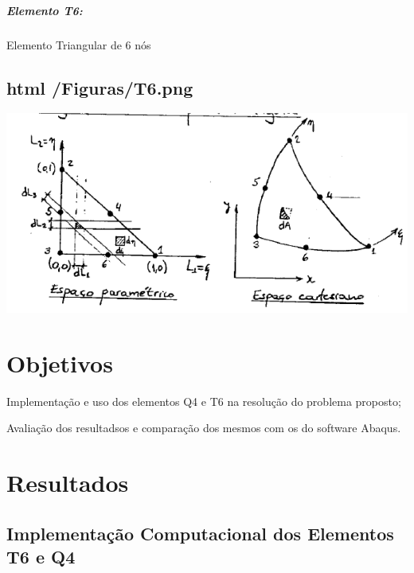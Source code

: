 \subparagraph*{Elemento T6\+:}


\begin{DoxyItemize}
\item Elemento Triangular de 6 nós
\end{DoxyItemize}

\subsection*{html /\+Figuras/\+T6.png}


\begin{DoxyImageNoCaption}
  \mbox{\includegraphics[width=\textwidth,height=\textheight/2,keepaspectratio=true]{T6.png}}
\end{DoxyImageNoCaption}
 

\section*{Objetivos}


\begin{DoxyItemize}
\item Implementação e uso dos elementos Q4 e T6 na resolução do problema proposto;
\item Avaliação dos resultadsos e comparação dos mesmos com os do software Abaqus.
\end{DoxyItemize}

\section*{Resultados}

\subsection*{Implementação Computacional dos Elementos T6 e Q4}


